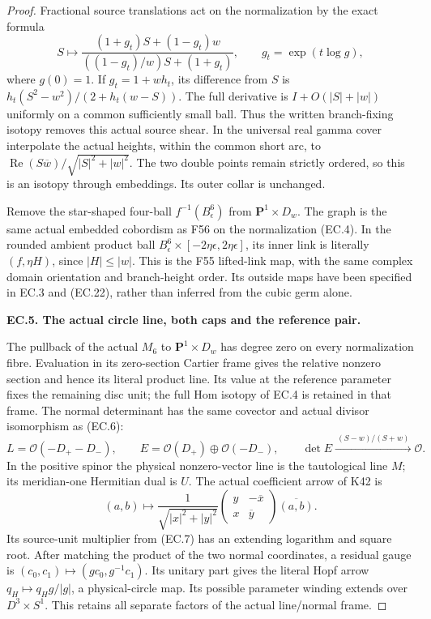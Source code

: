 \begin{proof}
Fractional source translations act on the normalization by the exact
formula
\[
 S\longmapsto
 \frac{(1+g_t)S+(1-g_t)w}
 {((1-g_t)/w)S+(1+g_t)},\qquad
 g_t=\exp(t\log g),
 \tag{EC.22}
\]
where \(g(0)=1\). If \(g_t=1+wh_t\), its difference from \(S\)
is \(h_t(S^2-w^2)/(2+h_t(w-S))\). The full derivative is
\(I+O(|S|+|w|)\) uniformly on a common sufficiently small ball.
Thus the written branch-fixing isotopy removes this actual source
shear. In the universal real gamma cover interpolate the actual
heights, within the common short arc, to
\(\operatorname{Re}(S\overline w)/\sqrt{|S|^2+|w|^2}\).
The two double points remain strictly ordered, so this is an
isotopy through embeddings. Its outer collar is unchanged.

Remove the star-shaped four-ball
\(f^{-1}(B^6_\epsilon)\) from \(\mathbf P^1\times D_w\).
The graph is the same actual embedded cobordism as F56 on the
normalization (EC.4). In the rounded ambient product ball
\(B^6_\epsilon\times[-2\eta\epsilon,2\eta\epsilon]\), its inner
link is literally \((f,\eta H)\), since \(|H|\le |w|\).
This is the F55 lifted-link map, with the same complex domain
orientation and branch-height order. Its outside maps have been
specified in EC.3 and (EC.22), rather than inferred from the cubic
germ alone.

\par\medskip\noindent\textbf{EC.5. The actual circle line, both caps and the reference pair.}\par\nopagebreak[4]

The pullback of the actual \(M_6\) to
\(\mathbf P^1\times D_w\) has degree zero on every normalization
fibre. Evaluation in its zero-section Cartier frame gives the
relative nonzero section and hence its literal product line.
Its value at the reference parameter fixes the remaining disc
unit; the full Hom isotopy of EC.4 is retained in that frame.
The normal determinant has the same covector and actual divisor
isomorphism as (EC.6):
\[
 L=\mathcal O(-D_+-D_-),\qquad
 E=\mathcal O(D_+)\oplus\mathcal O(-D_-),\qquad
 \det E\xrightarrow{\ (S-w)/(S+w)\ }\mathcal O.
 \tag{EC.23}
\]
In the positive spinor the physical nonzero-vector line is the
tautological line \(M\); its meridian-one Hermitian dual is \(U\).
The actual coefficient arrow of K42 is
\[
 (a,b)\longmapsto
 \frac1{\sqrt{|x|^2+|y|^2}}
 \begin{pmatrix}y&-\overline x\\x&\overline y\end{pmatrix}
 \overline{(a,b)}.
 \tag{EC.24}
\]
Its source-unit multiplier from (EC.7) has an extending logarithm
and square root. After matching the product of the two normal
coordinates, a residual gauge is \((c_0,c_1)\mapsto(gc_0,g^{-1}c_1)\).
Its unitary part gives the literal Hopf arrow
\(q_H\mapsto q_H g/|g|\), a physical-circle map. Its possible
parameter winding extends over \(D^3\times S^1\). This retains
all separate factors of the actual line/normal frame.


\end{proof}
